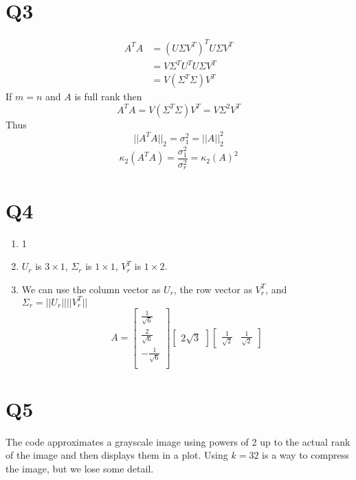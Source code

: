 \documentclass{article}
\begin{document}
\section*{Q3}
\begin{align*}
    A^TA &= (U\Sigma V^T)^T U\Sigma V^T \\
    &= V\Sigma^T U^T U\Sigma V^T \\
    &= V (\Sigma^T \Sigma) V^T
\end{align*}
If $m = n$ and $A$ is full rank then 
\[
    A^TA = V (\Sigma^T \Sigma) V^T = V\Sigma^2V^T
\]
Thus 
\[
    ||A^TA||_2 = \sigma_1^2 = ||A||_2^2
\] 
\[
    \kappa_2(A^TA) = \frac{\sigma_1^2}{\sigma_r^2} = \kappa_2(A)^2
\]
\section*{Q4}
\begin{enumerate}
    \item 1
    \item $U_r$ is $3\times1$, $\Sigma_r$ is $1\times1$, $V_r^T$ is $1\times2$.
    \item We can use the column vector as $U_r$, the row vector as $V_r^T$,
    and $\Sigma_r = ||U_r||||V_r^T||$
    \[
        A = \begin{bmatrix}
            \frac{1}{\sqrt{6}} \\
            \frac{2}{\sqrt{6}} \\
            -\frac{1}{\sqrt{6}} \\
        \end{bmatrix}
        \begin{bmatrix}
            2\sqrt{3}
        \end{bmatrix}
        \begin{bmatrix}
            \frac{1}{\sqrt{2}} & \frac{1}{\sqrt{2}}
        \end{bmatrix}
    \]
\end{enumerate}
\newpage

\section*{Q5}


The code approximates a grayscale image 
using powers of 2 up to the actual rank of the image 
and then displays them in a plot.
Using $k=32$ is a way to compress the image,
but we lose some detail.
\end{document}
